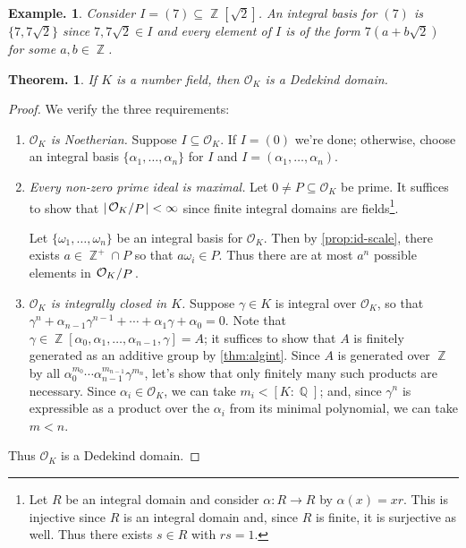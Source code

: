 \documentclass[11pt, a4paper]{memoir}
\DeclareMathOperator{\Q}{{\mathbb{Q}}}
\DeclareMathOperator{\Z}{{\mathbb{Z}}}
\newcommand{\abs}[1]{\ensuremath{\left\lvert#1\right\rvert}}
\theoremstyle{change}
\newtheorem{theorem}{Theorem.}[section]
\theoremstyle{plain}
\theoremstyle{nonumberplain}
\newtheorem{example}{Example.}
\newtheorem{proof}{Proof}
\newcommand{\quot}[2]{\mathchoice{\left.\raisebox{0.13em}{$#1$}\middle/\raisebox{-0.13em}{$#2$}\right.}
                                 {\left.\raisebox{0.07em}{$#1$}\middle/\raisebox{-0.07em}{$#2$}\right.}
                                 {\left.\raisebox{0.03em}{$#1$}\middle/\raisebox{-0.03em}{$#2$}\right.}
                                 {\left.\raisebox{0em}{$#1$}\middle/\raisebox{0em}{$#2$}\right.}}
\numberwithin{equation}{section}
\begin{document}
\begin{example}
    Consider $I=(7)\subseteq\Z[\sqrt{2}]$.
    An integral basis for $(7)$ is $\{7,7\sqrt{2}\}$ since $7,7\sqrt{2}\in I$ and every element of $I$ is of the form $7(a+b\sqrt{2})$ for some $a,b\in\Z$.
\end{example}
\begin{theorem}
    If $K$ is a number field, then $\mathcal{O}_K$ is a Dedekind domain.
\end{theorem}
\begin{proof}
    We verify the three requirements:
    \begin{enumerate}
        \item \textit{$\mathcal{O}_K$ is Noetherian.}
            Suppose $I\subseteq\mathcal{O}_K$.
            If $I=(0)$ we're done; otherwise, choose an integral basis $\{\alpha_1,\ldots,\alpha_n\}$ for $I$ and $I=(\alpha_1,\ldots,\alpha_n)$.
        \item \textit{Every non-zero prime ideal is maximal.}
            Let $0\neq P\subseteq\mathcal{O}_K$ be prime.
            It suffices to show that $\abs{\quot{\mathcal{O}_K}{P}}<\infty$ since finite integral domains are fields\footnote{Let $R$ be an integral domain and consider $\alpha:R\to R$ by $\alpha(x)=xr$.
                This is injective since $R$ is an integral domain and, since $R$ is finite, it is surjective as well.
            Thus there exists $s\in R$ with $rs=1$.}.

            Let $\{\omega_1,\ldots,\omega_n\}$ be an integral basis for $\mathcal{O}_K$.
            Then by \cref{prop:id-scale}, there exists $a\in\Z^+\cap P$ so that $a\omega_i\in P$.
            Thus there are at most $a^n$ possible elements in $\quot{\mathcal{O}_K}{P}$.
        \item \textit{$\mathcal{O}_K$ is integrally closed in $K$.}
            Suppose $\gamma\in K$ is integral over $\mathcal{O}_K$, so that $\gamma^n+\alpha_{n-1}\gamma^{n-1}+\cdots+\alpha_1\gamma+\alpha_0=0$.
            Note that $\gamma\in\Z[\alpha_0,\alpha_1,\ldots,\alpha_{n-1},\gamma]=A$; it suffices to show that $A$ is finitely generated as an additive group by \cref{thm:algint}.
            Since $A$ is generated over $\Z$ by all $\alpha_0^{m_0}\cdots\alpha_{n-1}^{m_{n-1}}\gamma^{m_n}$, let's show that only finitely many such products are necessary.
            Since $\alpha_i\in\mathcal{O}_K$, we can take $m_i<[K:\Q]$; and, since $\gamma^n$ is expressible as a product over the $\alpha_i$ from its minimal polynomial, we can take $m<n$.
    \end{enumerate}
    Thus $\mathcal{O}_K$ is a Dedekind domain.
\end{proof}
\end{document}
